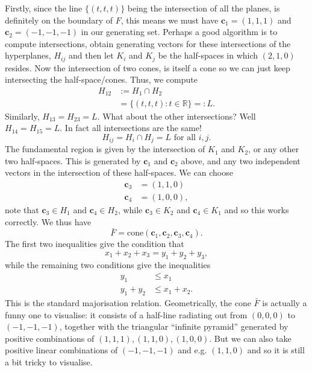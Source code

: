 \documentclass[pra,
aps,
twocolumn,
superscriptaddress,
groupedaddress,
nofootinbib,
reprint
]{revtex4-1}
\begin{document}
Firstly, since the line $\{(t,t,t)\}$ being the intersection of all the planes, is definitely on the boundary of $F$, this means we must have $\mathbf{c}_1 = (1,1,1)$ and $\mathbf{c}_2 = (-1,-1,-1)$ in our generating set. Perhaps a good algorithm is to compute intersections, obtain generating vectors for these intersections of the hyperplanes, $H_{ij}$ and then let $K_i$ and $K_j$ be the half-spaces in which $(2,1,0)$ resides. Now the intersection of two cones, is itself a cone so we can just keep intersecting the half-space/cones. Thus, we compute
\begin{align}
H_{12} &:= H_1 \cap H_2 \\
&=\{ (t,t,t) : t\in \mathbb{R}\}=:L.
\end{align}
Similarly, $H_{13} = H_{23}= L$. What about the other intersections? Well $H_{14} = H_{15}=L$. In fact all intersections are the same! 
\begin{equation}
H_{ij} = H_i \cap H_j = L \mbox{ for all } i,j.
\end{equation}
The fundamental region is given by the intersection of $K_1$ and $K_2$, or any other two half-spaces. This is generated by $\mathbf{c}_1$ and $\mathbf{c}_2$ above, and any two independent vectors in the intersection of these half-spaces. We can choose 
\begin{align}
\mathbf{c}_3 &= (1,1,0) \\
\mathbf{c}_4 &= (1,0,0),
\end{align}
note that $\mathbf{c}_3 \in H_1$ and $\mathbf{c}_4 \in H_2$, while $\mathbf{c}_3 \in K_2$ and $\mathbf{c}_4 \in K_1$ and so this works correctly. We thus have
\begin{equation}
\bar{F} = \mbox{cone}(\mathbf{c}_1 ,\mathbf{c}_2 ,\mathbf{c}_3 ,\mathbf{c}_4 ).
\end{equation}
The first two inequalities give the condition that
\begin{equation}
x_1+x_2+x_3 = y_1+y_2+y_3,
\end{equation}
while the remaining two conditions give the inequalities
\begin{align}
y_1 &\le x_1 \\
y_1+y_2 &\le x_1 +x_2.
\end{align}
This is the standard majorisation relation. Geometrically, the cone $\bar{F}$ is actually a funny one to visualise: it consists of a half-line radiating out from $(0,0,0)$ to $(-1, -1, -1)$, together with the triangular ``infinite pyramid'' generated by positive combinations of $(1,1,1), (1,1,0), (1,0,0)$. But we can also take positive linear combinations of $(-1,-1,-1)$ and e.g. $(1,1,0)$ and so it is still a bit tricky to visualise.
\end{document}
